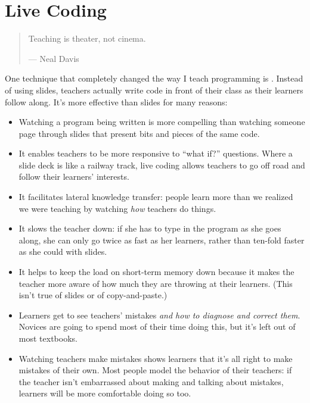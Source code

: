 \section{Live Coding}\label{s:performance-live}

\begin{quote}
Teaching is theater, not cinema.

--- Neal Davis
\end{quote}

One technique that completely changed the way I teach programming is
. Instead of using slides,
teachers actually write code in front of their class as their learners
follow along. It's more effective than slides for many reasons:

\begin{itemize}
\item
  Watching a program being written is more compelling than watching
  someone page through slides that present bits and pieces of the same
  code.
\item
  It enables teachers to be more responsive to ``what if?'' questions.
  Where a slide deck is like a railway track, live coding allows
  teachers to go off road and follow their learners' interests.
\item
  It facilitates lateral knowledge transfer: people learn more than we
  realized we were teaching by watching \emph{how} teachers do things.
\item
  It slows the teacher down: if she has to type in the program as she
  goes along, she can only go twice as fast as her learners, rather
  than ten-fold faster as she could with slides.
\item
  It helps to keep the load on short-term memory down because it makes
  the teacher more aware of how much they are throwing at their
  learners. (This isn't true of slides or of copy-and-paste.)
\item
  Learners get to see teachers' mistakes \emph{and how to diagnose and
  correct them}. Novices are going to spend most of their time doing
  this, but it's left out of most textbooks.
\item
  Watching teachers make mistakes shows learners that it's all right
  to make mistakes of their own. Most people model the behavior of
  their teachers: if the teacher isn't embarrassed about making and
  talking about mistakes, learners will be more comfortable doing so
  too.
\end{itemize}

